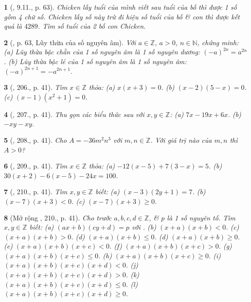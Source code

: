 \documentclass{article}
\newtheorem{baitoan}{}
\begin{document}
\begin{baitoan}[\cite{Binh_boi_duong_Toan_6_tap_1}, 9.11., p. 63]
	Chicken lấy tuổi của mình viết sau tuổi của bố thì được 1 số gồm 4 chữ số. Chicken lấy số này trừ đi hiệu số tuổi của bố \& con thì được kết quả là $4289$. Tìm số tuổi của 2 bố con Chicken.
\end{baitoan}

\begin{baitoan}[\cite{Binh_boi_duong_Toan_6_tap_1}, p. 63, Lũy thừa của số nguyên âm]
	Với $a\in\mathbb{Z}$, $a > 0$, $n\in\mathbb{N}$, chứng minh: (a) Lũy thừa bậc chẵn của 1 số nguyên âm là 1 số nguyên dương: $(-a)^{2n} = a^{2n}$. (b) Lũy thừa bậc lẻ của 1 số nguyên âm là 1 số nguyên âm: $(-a)^{2n + 1} = -a^{2n + 1}$.
\end{baitoan}

\begin{baitoan}[\cite{Tuyen_Toan_6}, 206., p. 41]
	Tìm $x\in\mathbb{Z}$ thỏa: (a) $x(x + 3) = 0$. (b) $(x - 2)(5 - x) = 0$. (c) $(x - 1)(x^2 + 1) = 0$.
\end{baitoan}

\begin{baitoan}[\cite{Tuyen_Toan_6}, 207., p. 41]
	Thu gọn các biểu thức sau với $x,y\in\mathbb{Z}$: (a) $7x - 19x + 6x$. (b) $-xy - xy$.
\end{baitoan}

\begin{baitoan}[\cite{Tuyen_Toan_6}, 208., p. 41]
	Cho $A = -36m^2n^3$ với $m,n\in\mathbb{Z}$. Với giá trị nào của $m,n$ thì $A > 0$?
\end{baitoan}

\begin{baitoan}[\cite{Tuyen_Toan_6}, 209., p. 41]
	Tìm $x\in\mathbb{Z}$ thỏa: (a) $-12(x - 5) + 7(3 - x) = 5$. (b) $30(x + 2) - 6(x - 5) - 24x = 100$.
\end{baitoan}

\begin{baitoan}[\cite{Tuyen_Toan_6}, 210., p. 41]
	Tìm $x,y\in\mathbb{Z}$ biết: (a) $(x - 3)(2y + 1) = 7$. (b) $(x - 7)(x + 3) < 0$. (c) $(x - 7)(x + 3)\ge0$.
\end{baitoan}

\begin{baitoan}[Mở rộng \cite{Tuyen_Toan_6}, 210., p. 41]
	Cho trước $a,b,c,d\in\mathbb{Z}$, \& $p$ là 1 số nguyên tố. Tìm $x,y\in\mathbb{Z}$ biết: (a) $(ax + b)(cy + d) = p$ với . (b) $(x + a)(x + b) < 0$. (c) $(x + a)(x + b) > 0$. (d) $(x + a)(x + b)\le0$. (d) $(x + a)(x + b)\ge0$. (e) $(x + a)(x + b)(x + c) < 0$. (f) $(x + a)(x + b)(x + c) > 0$. (g) $(x + a)(x + b)(x + c)\le0$. (h) $(x + a)(x + b)(x + c)\ge0$. (i) $(x + a)(x + b)(x + c)(x + d) < 0$. (j) $(x + a)(x + b)(x + c)(x + d) > 0$. (k) $(x + a)(x + b)(x + c)(x + d)\le0$. (l) $(x + a)(x + b)(x + c)(x + d)\ge0$.
\end{baitoan}
\end{document}
